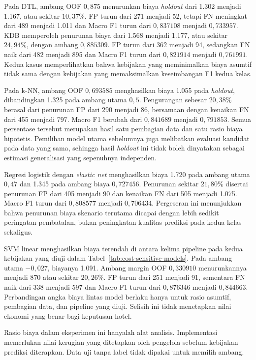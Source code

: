 Pada DTL, ambang OOF $0{,}875$ menurunkan biaya \textit{holdout} dari
1.302 menjadi 1.167, atau sekitar $10{,}37\%$. FP turun dari 271 menjadi
52, tetapi FN meningkat dari 489 menjadi 1.011 dan Macro F1 turun dari
$0{,}837108$ menjadi $0{,}733957$. KDB memperoleh penurunan biaya dari
1.568 menjadi 1.177, atau sekitar $24{,}94\%$, dengan ambang
$0{,}885309$. FP turun dari 362 menjadi 94, sedangkan FN naik dari
482 menjadi 895 dan Macro F1 turun dari $0{,}821914$ menjadi
$0{,}761991$. Kedua kasus memperlihatkan bahwa kebijakan yang
meminimalkan biaya asumtif tidak sama dengan kebijakan yang
memaksimalkan keseimbangan F1 kedua kelas.

Pada k-NN, ambang OOF $0{,}693585$ menghasilkan biaya 1.055 pada
\textit{holdout}, dibandingkan 1.325 pada ambang utama $0{,}5$.
Pengurangan sebesar $20{,}38\%$ berasal dari penurunan FP dari 290
menjadi 86, bersamaan dengan kenaikan FN dari 455 menjadi 797.
Macro F1 berubah dari $0{,}841689$ menjadi $0{,}791853$. Semua
persentase tersebut merupakan hasil satu pembagian data dan satu
rasio biaya hipotetis. Pemilihan model utama sebelumnya juga
melibatkan evaluasi kandidat pada data yang sama, sehingga hasil
\textit{holdout} ini tidak boleh dinyatakan sebagai estimasi
generalisasi yang sepenuhnya independen.

Regresi logistik dengan \textit{elastic net} menghasilkan biaya 1.720
pada ambang utama $0{,}47$ dan 1.345 pada ambang biaya $0{,}727456$.
Penurunan sekitar $21{,}80\%$ disertai penurunan FP dari 405 menjadi
90 dan kenaikan FN dari 505 menjadi 1.075. Macro F1 turun dari
$0{,}808577$ menjadi $0{,}706434$. Pergeseran ini menunjukkan bahwa
penurunan biaya skenario terutama dicapai dengan lebih sedikit
peringatan pembatalan, bukan peningkatan kualitas prediksi pada kedua
kelas sekaligus.

SVM linear menghasilkan biaya terendah di antara kelima pipeline pada
kedua kebijakan yang diuji dalam Tabel~\ref{tab:cost-sensitive-models}.
Pada ambang utama $-0{,}027$, biayanya 1.091. Ambang margin OOF
$0{,}330910$ menurunkannya menjadi 870 atau sekitar $20{,}26\%$.
FP turun dari 251 menjadi 91, sementara FN naik dari 338 menjadi 597
dan Macro F1 turun dari $0{,}876346$ menjadi $0{,}844663$.
Perbandingan angka biaya lintas model berlaku hanya untuk rasio
asumtif, pembagian data, dan pipeline yang diuji. Selisih ini tidak
menetapkan nilai ekonomi yang benar bagi keputusan hotel.

Rasio biaya dalam eksperimen ini hanyalah alat analisis. Implementasi
memerlukan nilai kerugian yang ditetapkan oleh pengelola sebelum kebijakan
prediksi diterapkan. Data uji tanpa label tidak dipakai untuk memilih
ambang.

